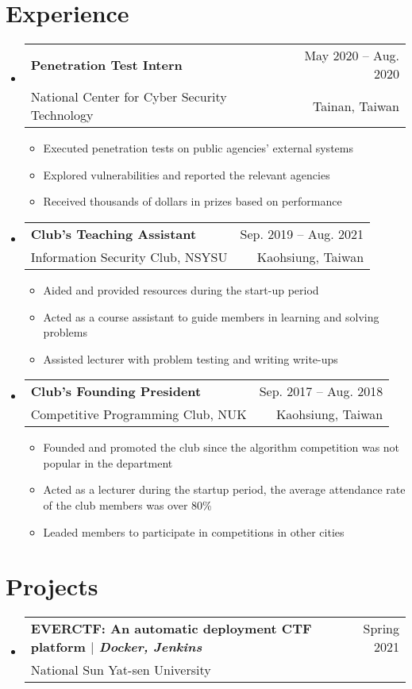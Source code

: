 \documentclass[A4,11pt]{article}
\makeatletter
\newcommand{\CVItem}[1]{
  \item\small{
    {#1 \vspace{-2pt}}
  }
}
\newcommand{\CVSubheading}[4]{
  \vspace{-2pt}\item
    \begin{tabular*}{0.97\textwidth}[t]{l@{\extracolsep{\fill}}r}
      \textbf{#1} & #2 \\
      \small#3 & \small #4 \\
    \end{tabular*}\vspace{-7pt}
}
\newcommand{\CVSubHeadingListStart}{\begin{itemize}[leftmargin=0.5cm, label={}]}
\newcommand{\CVSubHeadingListEnd}{\end{itemize}}
\newcommand{\CVItemListStart}{\begin{itemize}}
\newcommand{\CVItemListEnd}{\end{itemize}\vspace{-5pt}}
\makeatother
\begin{document}
  \section{Experience}
    \CVSubHeadingListStart
      \CVSubheading
        {Penetration Test Intern}{May 2020 -- Aug. 2020}
        {National Center for Cyber Security Technology}{Tainan, Taiwan}
        \CVItemListStart
          \CVItem{Executed penetration tests on public agencies' external systems}
          \CVItem{Explored vulnerabilities and reported the relevant agencies}
          \CVItem{Received thousands of dollars in prizes based on performance}
        \CVItemListEnd
      \CVSubheading
        {Club's Teaching Assistant}{Sep. 2019 -- Aug. 2021}
        {Information Security Club, NSYSU}{Kaohsiung, Taiwan}
        \CVItemListStart
          \CVItem{Aided and provided resources during the start-up period}
          \CVItem{Acted as a course assistant to guide members in learning and solving problems}
          \CVItem{Assisted lecturer with problem testing and writing write-ups}
        \CVItemListEnd
      \CVSubheading
        {Club's Founding President}{Sep. 2017 -- Aug. 2018}
        {Competitive Programming Club, NUK}{Kaohsiung, Taiwan}
        \CVItemListStart
          \CVItem{Founded and promoted the club since the algorithm competition was not popular in the department}
          \CVItem{Acted as a lecturer during the startup period, the average attendance rate of the club members was over 80\%}
          \CVItem{Leaded members to participate in competitions in other cities}
        \CVItemListEnd
    \CVSubHeadingListEnd

\begin{comment}
  Ideally the title of the work should speak for what it is. However if you feel
  like you should explain more about why the project is applicable to this job,
  use item list as is shown in the work experience section.
  \end{comment}
  
  \section{Projects}
    \CVSubHeadingListStart
      \CVSubheading
        {EVERCTF: An automatic deployment CTF platform $|$ \emph{\small{Docker, Jenkins}}}{Spring 2021}
        {National Sun Yat-sen University}{}
    \CVSubHeadingListEnd
\end{document}
